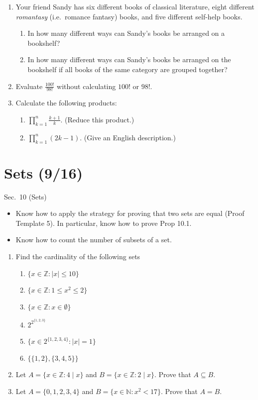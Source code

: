 \documentclass[11pt]{article}
\newcommand{\set}[1]{\{ #1 \}}
\begin{document}
\begin{enumerate}
\item Your friend Sandy has six different books of classical literature, eight different \textit{romantasy} (i.e.\ romance fantasy) books, and five different self-help books.
\begin{enumerate}
\item In how many different ways can Sandy's books be arranged on a bookshelf?
\item In how many different ways can Sandy's books be arranged on the bookshelf if all books of the same category are grouped together?
\end{enumerate}
\item Evaluate $\frac{100!}{98!}$ without calculating $100!$ or $98!$.
\item Calculate the following products:
\begin{enumerate}
\item $\prod_{k=1}^n \frac{k+1}{k}$. \quad (Reduce this product.)
\item $\prod_{k=1}^n (2k-1)$. \quad (Give an English description.)
\end{enumerate}
\end{enumerate}

\section*{Sets (9/16)}
\begin{textbook}{Sec.~10 (Sets)}
\begin{itemize}[leftmargin=*, nosep]
\item Know how to apply the strategy for proving that two sets are equal (Proof Template 5). In particular, know how to prove Prop 10.1.
\item Know how to count the number of subsets of a set.
\end{itemize}
\end{textbook}

\begin{enumerate}
\item Find the cardinality of the following sets
\begin{enumerate}
\item $\set{x \in \mathbb{Z}: |x| \leq 10}$
\item $\set{x \in \mathbb{Z}: 1 \leq x^2 \leq 2}$
\item $\set{x \in \mathbb{Z}: x \in \emptyset}$
\item $2^{2^{\set{1,2,3}}}$
\item $\set{x \in 2^{\set{1,2,3,4}}: |x|=1}$
\item $\set{\set{1,2}, \set{3,4,5}}$
\end{enumerate}
\item Let $A= \set{x \in \mathbb{Z}: 4 \mid x}$ and $B= \set{x \in \mathbb{Z}: 2 \mid x}$. Prove that $A \subseteq B$.
\item Let $A= \set{0,1,2,3,4}$ and $B= \set{x \in \mathbb{N}: x^2<17}$. Prove that $A=B$.
\end{enumerate}
\end{document}
